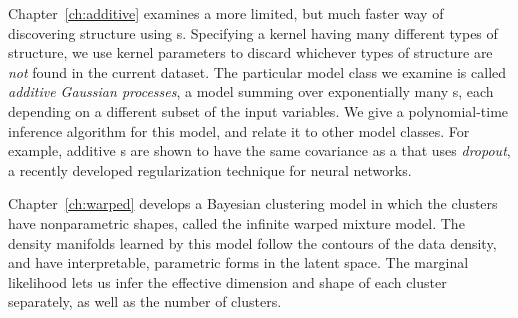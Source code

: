Chapter~\ref{ch:additive} examines a more limited, but much faster way of discovering structure using \gp{}s.
Specifying a kernel having many different types of structure, we use kernel parameters to discard whichever types of structure are \emph{not} found in the current dataset.
The particular model class we examine is called \emph{additive Gaussian processes}, a model summing over exponentially many \gp{}s, each depending on a different subset of the input variables.
We give a polynomial-time inference algorithm for this model, and relate it to other model classes.
For example, additive \gp{}s are shown to have the same covariance as a \gp{} that uses \emph{dropout}, a recently developed regularization technique for neural networks.

Chapter~\ref{ch:warped} develops a Bayesian clustering model in which the clusters have nonparametric shapes, called the infinite warped mixture model.
The density manifolds learned by this model follow the contours of the data density, and have interpretable, parametric forms in the latent space.
The marginal likelihood lets us infer the effective dimension and shape of each cluster separately, as well as the number of clusters.

\outbpdocument{


}


